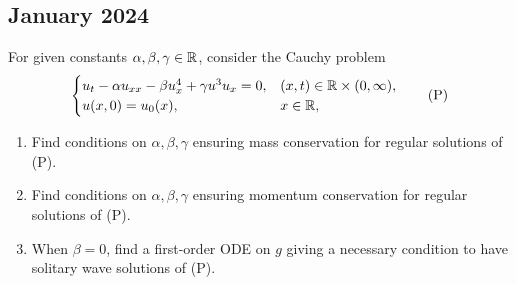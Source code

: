 \subsection{January 2024}
\begin{exercise}
    For given constants \(\alpha, \beta, \gamma \in \mathbb{R}\), consider the Cauchy problem
    \[
        \begin{cases}
            u_{t} - \alpha u_{xx} - \beta u_{x}^4 + \gamma u^3u_x = 0, & (x,t) \in \mathbb{R} \times (0, \infty), \\
            u(x,0) = u_0(x), & x \in \mathbb{R}, \\
        \end{cases}
        \tag*{(P)}
    \]
    \begin{enumerate}
        \item Find conditions on \(\alpha, \beta, \gamma\) ensuring mass conservation for regular solutions of (P).
        \item Find conditions on \(\alpha, \beta, \gamma\) ensuring momentum conservation for regular solutions of (P).
        \item When \(\beta = 0\), find a first-order ODE on \(g\) giving a necessary condition to have solitary wave solutions of (P).
    \end{enumerate}
\end{exercise}
